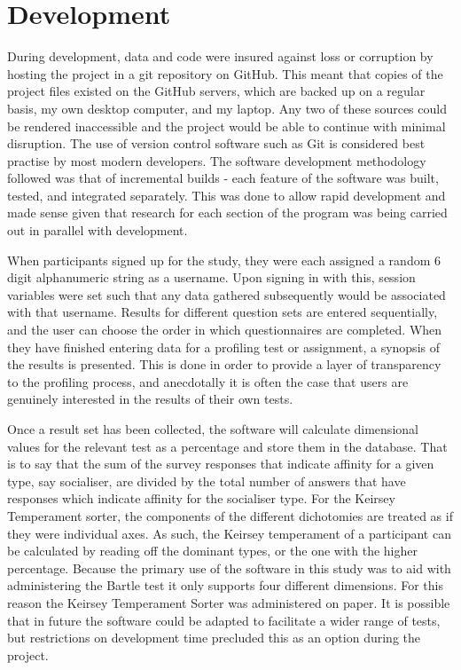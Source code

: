 \documentclass[12pt,a4paper,twoside]{report}
\begin{document}
\section{Development}
During development, data and code were insured against loss or corruption by hosting the project in a git repository on GitHub. This meant that copies of the project files existed on the GitHub servers, which are backed up on a regular basis, my own desktop computer, and my laptop. Any two of these sources could be rendered inaccessible and the project would be able to continue with minimal disruption. The use of version control software such as Git is considered best practise by most modern developers. The software development methodology followed was that of incremental builds - each feature of the software was built, tested, and integrated separately. This was done to allow rapid development and made sense given that research for each section of the program was being carried out in parallel with development.

When participants signed up for the study, they were each assigned a random 6 digit alphanumeric string as a username. Upon signing in with this, session variables were set such that any data gathered subsequently would be associated with that username. Results for different question sets are entered sequentially, and the user can choose the order in which questionnaires are completed. When they have finished entering data for a profiling test or assignment, a synopsis of the results is presented. This is done in order to provide a layer of transparency to the profiling process, and anecdotally it is often the case that users are genuinely interested in the results of their own tests.

Once a result set has been collected, the software will calculate dimensional values for the relevant test as a percentage and store them in the database. That is to say that the sum of the survey responses that indicate affinity for a given type, say socialiser, are divided by the total number of answers that have responses which indicate affinity for the socialiser type. For the Keirsey Temperament sorter, the components of the different dichotomies are treated as if they were individual axes. As such, the Keirsey temperament of a participant can be calculated by reading off the dominant types, or the one with the higher percentage. Because the primary use of the software in this study was to aid with administering the Bartle test it only supports four different dimensions. For this reason the Keirsey Temperament Sorter was administered on paper. It is possible that in future the software could be adapted to facilitate a wider range of tests, but restrictions on development time precluded this as an option during the project.
\end{document}
